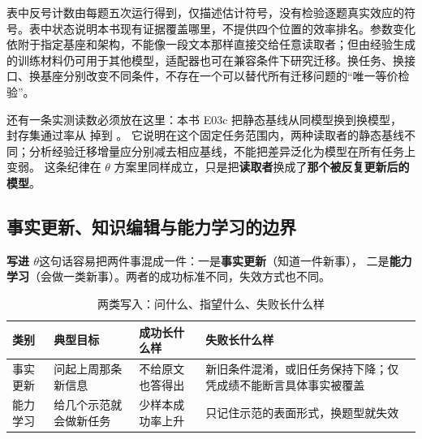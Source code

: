 \begin{sloppypar}
表中反号计数由每题五次运行得到，仅描述估计符号，没有检验逐题真实效应的符号。表中状态说明本书现有证据覆盖哪里，不提供四个位置的效率排名。参数变化依附于指定基座和架构，不能像一段文本那样直接交给任意读取者；但由经验生成的训练材料仍可用于其他模型，适配器也可在兼容条件下研究迁移。换任务、换接口、换基座分别改变不同条件，不存在一个可以替代所有迁移问题的“唯一等价检验”。\end{sloppypar}

\begin{sloppypar}
还有一条实测读数必须放在这里：本书 E03c 把静态基线从同模型换到换模型，
封存集通过率从  掉到 。
它说明在这个固定任务范围内，两种读取者的静态基线不同；分析经验迁移增量应分别减去相应基线，不能把差异泛化为模型在所有任务上变弱。
这条纪律在 $\theta$ 方案里同样成立，只是把\textbf{读取者}换成了\textbf{那个被反复更新后的模型}。
\end{sloppypar}

\subsection{事实更新、知识编辑与能力学习的边界}
\label{sec:ch10-boundary}

\begin{sloppypar}
\textbf{写进 $\theta$}这句话容易把两件事混成一件：一是\textbf{事实更新}（知道一件新事），
二是\textbf{能力学习}（会做一类新事）。两者的成功标准不同，失效方式也不同。
\end{sloppypar}

\begin{table}[htbp]
\centering
\caption{两类写入：问什么、指望什么、失败长什么样}
\label{tab:ch10-kind}
\begin{small}
\setlength{\tabcolsep}{3pt}
\begin{tabular}{>{\raggedright\arraybackslash}p{2.2cm}>{\raggedright\arraybackslash}p{3.8cm}>{\raggedright\arraybackslash}p{4.4cm}>{\raggedright\arraybackslash}p{4.2cm}}
\toprule
类别 & 典型目标 & 成功长什么样 & 失败长什么样 \\
\midrule
事实更新 & 问起上周那条新信息 & 不给原文也答得出 & 新旧条件混淆，或旧任务保持下降；仅凭成绩不能断言具体事实被覆盖 \\
\midrule
能力学习 & 给几个示范就会做新任务 & 少样本成功率上升 & 只记住示范的表面形式，换题型就失效 \\
\bottomrule
\end{tabular}
\end{small}
\end{table}

